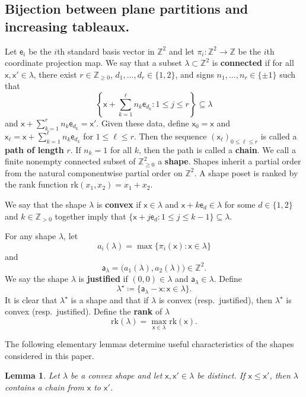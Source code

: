 \documentclass[12pt]{amsart}
\newcommand{\x}{\ensuremath{\mathsf{x}}}
\newcommand{\e}{\ensuremath{\mathsf{e}}}
\newcommand{\aaa}{\ensuremath{\mathsf{a}}}
\newtheorem{lemma}[theorem]{Lemma}
\theoremstyle{definition}
\theoremstyle{remark}
\numberwithin{equation}{section}
\newcommand{\rank}{\ensuremath{\mathrm{rk}}}
\begin{document}
\subsection{Bijection between plane partitions and increasing tableaux.} 

Let $\e_i$ be the $i$th standard basis vector in $\mathbb{Z}^{2}$ and let $\pi_i : \mathbb{Z}^{2} \to \mathbb{Z}$ be the $i$th coordinate projection map. We say that a subset $\lambda \subset \mathbb{Z}^{2}$ is {\bf connected} if for all $\x,\x' \in \lambda$, there exist $r \in \mathbb{Z}_{\geq 0}$, $d_1,...,d_r \in \{1, 2 \}$, and signs $n_1,...,n_r \in \{ \pm 1 \}$ such that 
\[\left\{ \x + \sum_{k=1}^\ell n_k \e_{d_k} :  1\leq j \leq r \right\} \subseteq \lambda\]
 and $\x + \sum_{k=1}^r n_k \e_{d_k} = \x'$. Given these data, define $\x_0 = \x$ and $\x_\ell = \x + \sum_{k=1}^\ell n_k \e_{d_k}$ for $1 \leq \ell \leq r$. Then the sequence $\left( \x_\ell  \right)_{0 \leq \ell \leq r}$ is called a {\bf path of length} $r$. If $n_k = 1$ for all $k$, then the path is called a {\bf chain}. We call a finite nonempty connected subset of $\mathbb{Z}_{\geq 0}^2$ a {\bf shape}.  Shapes inherit a partial order from the natural componentwise partial order on $\mathbb{Z}^2$. A shape poset is ranked by the rank function $\text{rk}(x_1,x_2) = x_1 + x_2$.

We say that the shape $\lambda$ is {\bf convex} if $\x\in \lambda$ and $\x + k  \e_d \in \lambda $ for some $d \in \{1, 2\}$ and $k \in \mathbb{Z}_{> 0}$ together imply  that $\{\x + j \e_d : 1 \leq j \leq k-1 \} \subseteq \lambda.$

For any shape $\lambda$, let \[a_i(\lambda) = \max \{ \pi_i(\x) \colon \x \in \lambda\}\] and \[\aaa_\lambda = \big(a_1(\lambda),a_{2}(\lambda)\big) \in \mathbb{Z}^2.\] We say the shape $\lambda$ is {\bf justified} if $(0,0) \in \lambda$ and $\aaa_{\lambda} \in \lambda$. Define 
\[
\lambda^\star \coloneqq \lbrace \aaa_\lambda - \x: \x \in \lambda \rbrace.
\] It is clear that $\lambda^{\star}$ is a shape and that if $\lambda$ is convex (resp.\ justified), then $\lambda^\star$ is convex (resp.\ justified).  Define the {\bf rank} of $\lambda$ 
\[ 
\rank(\lambda) = \max_{\x \in \lambda} \rank(\x).
\]

The following elementary lemmas determine useful characteristics of the shapes considered in this paper. 

\begin{lemma} \label{lem:convex_chain}
Let $\lambda$ be a convex shape and let $\x,\x' \in \lambda$ be distinct. If $\x \leq \x'$, then $\lambda$ contains a chain from $\x$ to $\x'$. 
\end{lemma}
\end{document}
